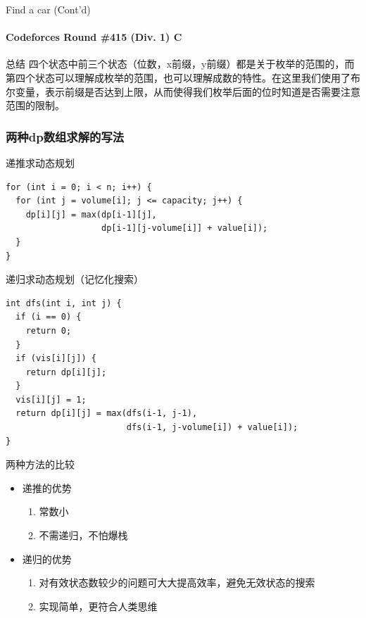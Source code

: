 \documentclass[hyperref={unicode=true}]{beamer}
\theoremstyle{definition}
\theoremstyle{proof}
\begin{document}
\begin{frame}{Find a car (Cont'd)}\framesubtitle{Codeforces Round \#415 (Div. 1) C}
  \begin{exampleblock}{总结}
    四个状态中前三个状态（位数，x前缀，y前缀）都是关于枚举的范围的，而第四个状态可以理解成枚举的范围，也可以理解成数的特性。在这里我们使用了布尔变量，表示前缀是否达到上限，从而使得我们枚举后面的位时知道是否需要注意范围的限制。
  \end{exampleblock}
\end{frame}

\subsubsection{两种dp数组求解的写法}
\begin{frame}[fragile]{递推求动态规划}
  \begin{verbatim}
for (int i = 0; i < n; i++) {
  for (int j = volume[i]; j <= capacity; j++) {
    dp[i][j] = max(dp[i-1][j],
                   dp[i-1][j-volume[i]] + value[i]);
  }
}
  \end{verbatim}
\end{frame}

\begin{frame}[fragile]{递归求动态规划（记忆化搜索）}
  \begin{verbatim}
int dfs(int i, int j) {
  if (i == 0) {
    return 0;
  }
  if (vis[i][j]) {
    return dp[i][j];
  }
  vis[i][j] = 1;
  return dp[i][j] = max(dfs(i-1, j-1),
                        dfs(i-1, j-volume[i]) + value[i]);
}
  \end{verbatim}
\end{frame}
\begin{frame}{两种方法的比较}
  \begin{itemize}[<+->]
  \item 递推的优势
    \begin{enumerate}
    \item 常数小
    \item 不需递归，不怕爆栈
    \end{enumerate}
  \item 递归的优势
    \begin{enumerate}
    \item 对有效状态数较少的问题可大大提高效率，避免无效状态的搜索
    \item 实现简单，更符合人类思维
    \end{enumerate}
  \end{itemize}
\end{frame}
\end{document}
